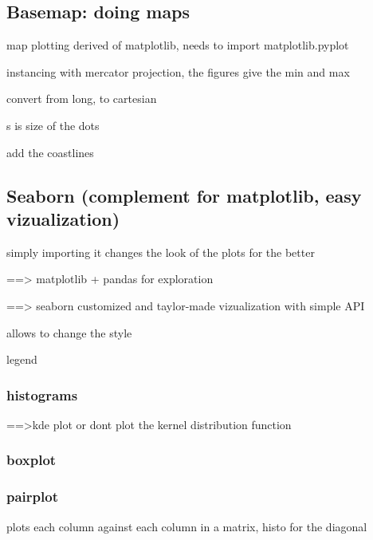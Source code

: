 	\subsection{Basemap: doing maps}
	
		map plotting derived of matplotlib, needs to import matplotlib.pyplot


		 instancing with mercator projection, the figures give the min and max

		 convert from long, to cartesian

		 s is size of the dots

		 add the coastlines

	\subsection{Seaborn (complement for matplotlib, easy vizualization)}

		simply importing it changes the look of the plots for the better

		==> matplotlib + pandas for exploration

		==> seaborn customized and taylor-made vizualization with simple API


		 allows to change the style

		 legend

		\subsubsection{histograms}



			==>kde plot or dont plot the kernel distribution function

		\subsubsection{boxplot}

		\subsubsection{pairplot}
			plots each column against each column in a matrix, histo for the diagonal

